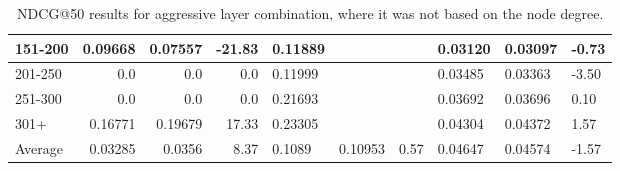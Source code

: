 \begin{table*}[h!]
\begin{tabular}{|l|r|r|r||l|r|r||l|l|l|}
        151-200 & 0.09668                                 & 0.07557                        & -21.83                           & 0.11889                    &                          &                            & 0.03120 & 0.03097                & -0.73                  \\ \hline
        201-250 & 0.0                                     & 0.0                            & 0.0                              & 0.11999                    &                          &                            & 0.03485 & 0.03363                & -3.50                  \\ \hline
        251-300 & 0.0                                     & 0.0                            & 0.0                              & 0.21693                    &                          &                            & 0.03692 & 0.03696                & 0.10                   \\ \hline
        301+    & 0.16771                                 & 0.19679                        & 17.33                            & 0.23305                    &                          &                            & 0.04304 & 0.04372                & 1.57                   \\ \hline
        Average & 0.03285                                 & 0.0356                         & 8.37                             & 0.1089                     & 0.10953                  & 0.57                       & 0.04647 & 0.04574                & -1.57                  \\ \hline
    \end{tabular}
    \caption{NDCG@50 results for aggressive layer combination, where it was not based on the node degree.}
    \label{tab:aggressive-layer-combination-ndcg}
\end{table*}

